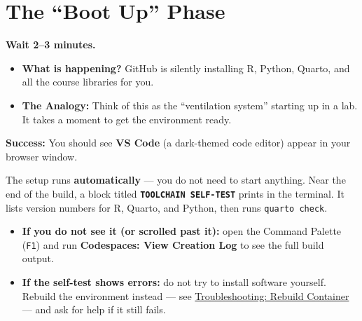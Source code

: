 \documentclass[
  letterpaper,
  DIV=11,
  numbers=noendperiod,
  oneside]{scrreprt}
\providecommand{\tightlist}{%
  \setlength{\itemsep}{0pt}\setlength{\parskip}{0pt}}
\begin{document}
\section{The ``Boot Up'' Phase}\label{the-boot-up-phase}

\textbf{Wait 2--3 minutes.}

\begin{itemize}
\tightlist
\item
  \textbf{What is happening?} GitHub is silently installing R, Python,
  Quarto, and all the course libraries for you.
\item
  \textbf{The Analogy:} Think of this as the ``ventilation system''
  starting up in a lab. It takes a moment to get the environment ready.
\end{itemize}

\textbf{Success:} You should see \textbf{VS Code} (a dark-themed code
editor) appear in your browser window.

\begin{tcolorbox}[enhanced jigsaw, title=\textcolor{quarto-callout-note-color}{\faInfo}\hspace{0.5em}{The TOOLCHAIN SELF-TEST}, arc=.35mm, toptitle=1mm, colframe=quarto-callout-note-color-frame, toprule=.15mm, leftrule=.75mm, bottomtitle=1mm, opacityback=0, bottomrule=.15mm, coltitle=black, breakable, opacitybacktitle=0.6, titlerule=0mm, colback=white, left=2mm, colbacktitle=quarto-callout-note-color!10!white, rightrule=.15mm]

The setup runs \textbf{automatically} --- you do not need to start
anything. Near the end of the build, a block titled
\textbf{\texttt{TOOLCHAIN\ SELF-TEST}} prints in the terminal. It lists
version numbers for R, Quarto, and Python, then runs
\texttt{quarto\ check}.

\begin{itemize}
\tightlist
\item
  \textbf{If you do not see it (or scrolled past it):} open the Command
  Palette (\texttt{F1}) and run \textbf{Codespaces: View Creation Log}
  to see the full build output.
\item
  \textbf{If the self-test shows errors:} do not try to install software
  yourself. Rebuild the environment instead --- see
  \href{workflows09-troubleshooting.qmd}{Troubleshooting: Rebuild
  Container} --- and ask for help if it still fails.
\end{itemize}

\end{tcolorbox}
\end{document}
